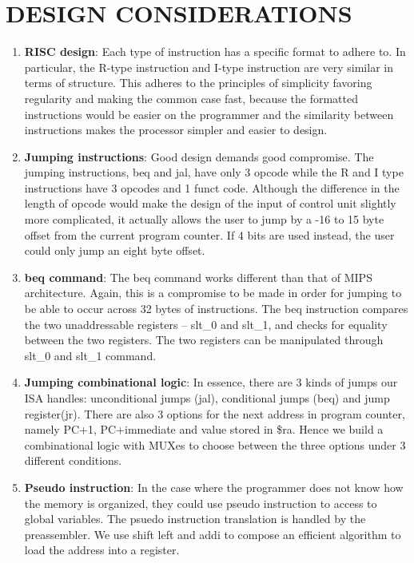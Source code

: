 \documentclass[11pt, titlepage]{article}
\begin{document}
\section{DESIGN CONSIDERATIONS}
\begin{enumerate}
  \item \textbf{RISC design}: Each type of instruction has a specific format to adhere to. In particular, the R-type instruction and I-type instruction are very similar in terms of structure. This adheres to the principles of simplicity favoring regularity and making the common case fast, because the formatted instructions would be easier on the programmer and the similarity between instructions makes the processor simpler and easier to design. 
  \item \textbf{Jumping instructions}: Good design demands good compromise. The jumping instructions, beq and jal, have only 3 opcode while the R and I type instructions have 3 opcodes and 1 funct code. Although the difference in the length of opcode would make the design of the input of control unit slightly more complicated, it actually allows the user to jump by a -16 to 15 byte offset from the current program counter. If 4 bits are used instead, the user could only jump an eight byte offset. 
  \item \textbf{beq command}: The beq command works different than that of MIPS architecture. Again, this is a compromise to be made in order for jumping to be able to occur across 32 bytes of instructions. The beq instruction compares the two unaddressable registers -- slt\_0 and slt\_1, and checks for equality between the two registers. The two registers can be manipulated through slt\_0 and slt\_1 command.
  \item \textbf{Jumping combinational logic}: In essence, there are 3 kinds of jumps our ISA handles: unconditional jumps (jal), conditional jumps (beq) and jump register(jr). There are also 3 options for the next address in program counter, namely PC+1, PC+immediate and value stored in \$ra. Hence we build a combinational logic with MUXes to choose between the three options under 3 different conditions.
  \item \textbf{Pseudo instruction}: In the case where the programmer does not know how the memory is organized, they could use pseudo instruction to access to global variables. The psuedo instruction translation is handled by the preassembler. We use shift left and addi to compose an efficient algorithm to load the address into a register. 
\end{enumerate}
\end{document}
